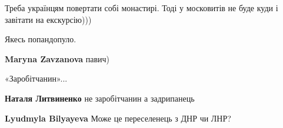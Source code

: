 \begin{itemize}

 
Треба українцям повертати собі монастирі. Тоді у московитів не буде куди і завітати на екскурсію)))

 
Якесь попандопуло.


\begin{itemize}
 
\textbf{Maryna Zavzanova} павич)
\end{itemize}

 
«Заробітчанин»...

\begin{itemize}
 
\textbf{Наталя Литвиненко} не заробітчанин а задрипанець

 
\textbf{Lyudmyla Bilyayeva} Може це переселенець з ДНР чи ЛНР?
\end{itemize}


\end{itemize}
